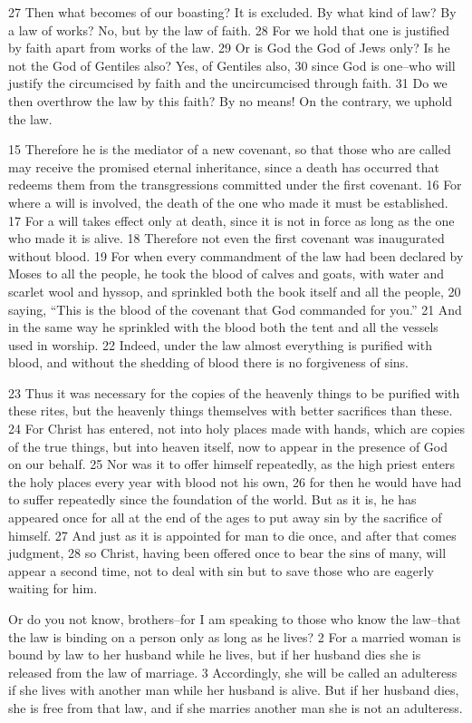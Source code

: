 \begin{bible}
27 Then what becomes of our boasting? It is excluded. By what kind of law? By a law of works? No, but by the law of faith. 28 For we hold that one is justified by faith apart from works of the law. 29 Or is God the God of Jews only? Is he not the God of Gentiles also? Yes, of Gentiles also, 30 since God is one--who will justify the circumcised by faith and the uncircumcised through faith. 31 Do we then overthrow the law by this faith? By no means! On the contrary, we uphold the law.

15 Therefore he is the mediator of a new covenant, so that those who are called may receive the promised eternal inheritance, since a death has occurred that redeems them from the transgressions committed under the first covenant. 16 For where a will is involved, the death of the one who made it must be established. 17 For a will takes effect only at death, since it is not in force as long as the one who made it is alive. 18 Therefore not even the first covenant was inaugurated without blood. 19 For when every commandment of the law had been declared by Moses to all the people, he took the blood of calves and goats, with water and scarlet wool and hyssop, and sprinkled both the book itself and all the people, 20 saying, ``This is the blood of the covenant that God commanded for you.'' 21 And in the same way he sprinkled with the blood both the tent and all the vessels used in worship. 22 Indeed, under the law almost everything is purified with blood, and without the shedding of blood there is no forgiveness of sins.

23 Thus it was necessary for the copies of the heavenly things to be purified with these rites, but the heavenly things themselves with better sacrifices than these. 24 For Christ has entered, not into holy places made with hands, which are copies of the true things, but into heaven itself, now to appear in the presence of God on our behalf. 25 Nor was it to offer himself repeatedly, as the high priest enters the holy places every year with blood not his own, 26 for then he would have had to suffer repeatedly since the foundation of the world. But as it is, he has appeared once for all at the end of the ages to put away sin by the sacrifice of himself. 27 And just as it is appointed for man to die once, and after that comes judgment, 28 so Christ, having been offered once to bear the sins of many, will appear a second time, not to deal with sin but to save those who are eagerly waiting for him.

Or do you not know, brothers--for I am speaking to those who know the law--that the law is binding on a person only as long as he lives? 2 For a married woman is bound by law to her husband while he lives, but if her husband dies she is released from the law of marriage. 3 Accordingly, she will be called an adulteress if she lives with another man while her husband is alive. But if her husband dies, she is free from that law, and if she marries another man she is not an adulteress.


\end{bible}
